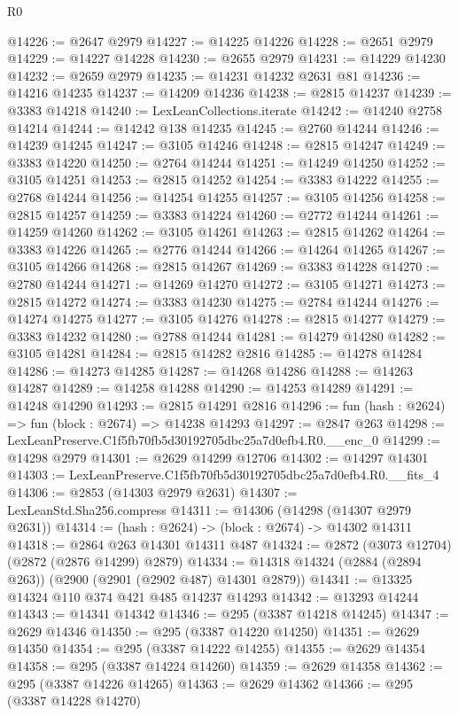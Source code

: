 \begin{lexlean}{R0}
\begin{coremodule}
@14226 := @2647 @2979
@14227 := @14225 @14226
@14228 := @2651 @2979
@14229 := @14227 @14228
@14230 := @2655 @2979
@14231 := @14229 @14230
@14232 := @2659 @2979
@14235 := @14231 @14232 @2631 @81
@14236 := @14216 @14235
@14237 := @14209 @14236
@14238 := @2815 @14237
@14239 := @3383 @14218
@14240 := LexLeanCollections.iterate
@14242 := @14240 @2758 @14214
@14244 := @14242 @138 @14235
@14245 := @2760 @14244
@14246 := @14239 @14245
@14247 := @3105 @14246
@14248 := @2815 @14247
@14249 := @3383 @14220
@14250 := @2764 @14244
@14251 := @14249 @14250
@14252 := @3105 @14251
@14253 := @2815 @14252
@14254 := @3383 @14222
@14255 := @2768 @14244
@14256 := @14254 @14255
@14257 := @3105 @14256
@14258 := @2815 @14257
@14259 := @3383 @14224
@14260 := @2772 @14244
@14261 := @14259 @14260
@14262 := @3105 @14261
@14263 := @2815 @14262
@14264 := @3383 @14226
@14265 := @2776 @14244
@14266 := @14264 @14265
@14267 := @3105 @14266
@14268 := @2815 @14267
@14269 := @3383 @14228
@14270 := @2780 @14244
@14271 := @14269 @14270
@14272 := @3105 @14271
@14273 := @2815 @14272
@14274 := @3383 @14230
@14275 := @2784 @14244
@14276 := @14274 @14275
@14277 := @3105 @14276
@14278 := @2815 @14277
@14279 := @3383 @14232
@14280 := @2788 @14244
@14281 := @14279 @14280
@14282 := @3105 @14281
@14284 := @2815 @14282 @2816
@14285 := @14278 @14284
@14286 := @14273 @14285
@14287 := @14268 @14286
@14288 := @14263 @14287
@14289 := @14258 @14288
@14290 := @14253 @14289
@14291 := @14248 @14290
@14293 := @2815 @14291 @2816
@14296 := fun (hash : @2624) => fun (block : @2674) => @14238 @14293
@14297 := @2847 @263
@14298 := LexLeanPreserve.C1f5fb70fb5d30192705dbc25a7d0efb4.R0.__enc_0
@14299 := @14298 @2979
@14301 := @2629 @14299 @12706
@14302 := @14297 @14301
@14303 := LexLeanPreserve.C1f5fb70fb5d30192705dbc25a7d0efb4.R0.__fits_4
@14306 := @2853 (@14303 @2979 @2631)
@14307 := LexLeanStd.Sha256.compress
@14311 := @14306 (@14298 (@14307 @2979 @2631))
@14314 := (hash : @2624) -> (block : @2674) -> @14302 @14311
@14318 := @2864 @263 @14301 @14311 @487
@14324 := @2872 (@3073 @12704) (@2872 (@2876 @14299) @2879)
@14334 := @14318 @14324 (@2884 (@2894 @263)) (@2900 (@2901 (@2902 @487) @14301 @2879))
@14341 := @13325 @14324 @110 @374 @421 @485 @14237 @14293
@14342 := @13293 @14244
@14343 := @14341 @14342
@14346 := @295 (@3387 @14218 @14245)
@14347 := @2629 @14346
@14350 := @295 (@3387 @14220 @14250)
@14351 := @2629 @14350
@14354 := @295 (@3387 @14222 @14255)
@14355 := @2629 @14354
@14358 := @295 (@3387 @14224 @14260)
@14359 := @2629 @14358
@14362 := @295 (@3387 @14226 @14265)
@14363 := @2629 @14362
@14366 := @295 (@3387 @14228 @14270)

\end{coremodule}
\end{lexlean}
